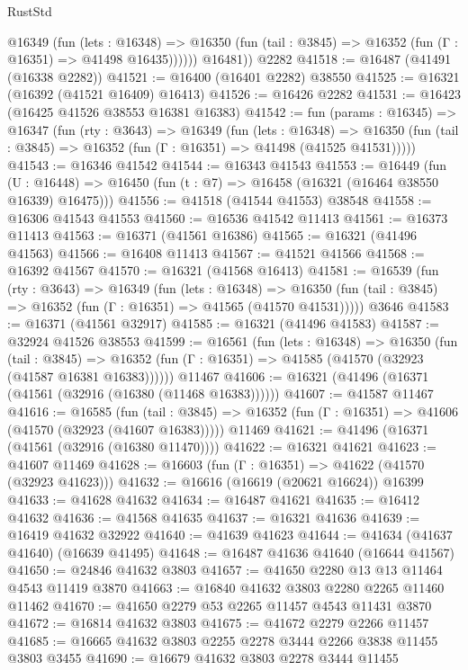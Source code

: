 \begin{lexlean}{RustStd}
\begin{coremodule}
            @16349
              (fun (lets : @16348) =>
              @16350 (fun (tail : @3845) => @16352 (fun (Γ : @16351) => @41498 @16435))))))
        @16481))
    @2282
@41518 := @16487 (@41491 (@16338 @2282))
@41521 := @16400 (@16401 @2282) @38550
@41525 := @16321 (@16392 (@41521 @16409) @16413)
@41526 := @16426 @2282
@41531 := @16423 (@16425 @41526 @38553 @16381 @16383)
@41542 := fun (params : @16345) =>
  @16347
    (fun (rty : @3643) =>
    @16349
      (fun (lets : @16348) =>
      @16350 (fun (tail : @3845) => @16352 (fun (Γ : @16351) => @41498 (@41525 @41531)))))
@41543 := @16346 @41542
@41544 := @16343 @41543
@41553 := @16449
    (fun (U : @16448) => @16450 (fun (t : @7) => @16458 (@16321 (@16464 @38550 @16339) @16475)))
@41556 := @41518 (@41544 @41553) @38548
@41558 := @16306 @41543 @41553
@41560 := @16536 @41542 @11413
@41561 := @16373 @11413
@41563 := @16371 (@41561 @16386)
@41565 := @16321 (@41496 @41563)
@41566 := @16408 @11413
@41567 := @41521 @41566
@41568 := @16392 @41567
@41570 := @16321 (@41568 @16413)
@41581 := @16539
    (fun (rty : @3643) =>
    @16349
      (fun (lets : @16348) =>
      @16350 (fun (tail : @3845) => @16352 (fun (Γ : @16351) => @41565 (@41570 @41531)))))
    @3646
@41583 := @16371 (@41561 @32917)
@41585 := @16321 (@41496 @41583)
@41587 := @32924 @41526 @38553
@41599 := @16561
    (fun (lets : @16348) =>
    @16350
      (fun (tail : @3845) =>
      @16352 (fun (Γ : @16351) => @41585 (@41570 (@32923 (@41587 @16381 @16383))))))
    @11467
@41606 := @16321 (@41496 (@16371 (@41561 (@32916 (@16380 (@11468 @16383))))))
@41607 := @41587 @11467
@41616 := @16585
    (fun (tail : @3845) => @16352 (fun (Γ : @16351) => @41606 (@41570 (@32923 (@41607 @16383)))))
    @11469
@41621 := @41496 (@16371 (@41561 (@32916 (@16380 @11470))))
@41622 := @16321 @41621
@41623 := @41607 @11469
@41628 := @16603 (fun (Γ : @16351) => @41622 (@41570 (@32923 @41623)))
@41632 := @16616 (@16619 (@20621 @16624)) @16399
@41633 := @41628 @41632
@41634 := @16487 @41621
@41635 := @16412 @41632
@41636 := @41568 @41635
@41637 := @16321 @41636
@41639 := @16419 @41632 @32922
@41640 := @41639 @41623
@41644 := @41634 (@41637 @41640) (@16639 @41495)
@41648 := @16487 @41636 @41640 (@16644 @41567)
@41650 := @24846 @41632 @3803
@41657 := @41650 @2280 @13 @13 @11464 @4543 @11419 @3870
@41663 := @16840 @41632 @3803 @2280 @2265 @11460 @11462
@41670 := @41650 @2279 @53 @2265 @11457 @4543 @11431 @3870
@41672 := @16814 @41632 @3803
@41675 := @41672 @2279 @2266 @11457
@41685 := @16665 @41632 @3803 @2255 @2278 @3444 @2266 @3838 @11455 @3803 @3455
@41690 := @16679 @41632 @3803 @2278 @3444 @11455

\end{coremodule}
\end{lexlean}
